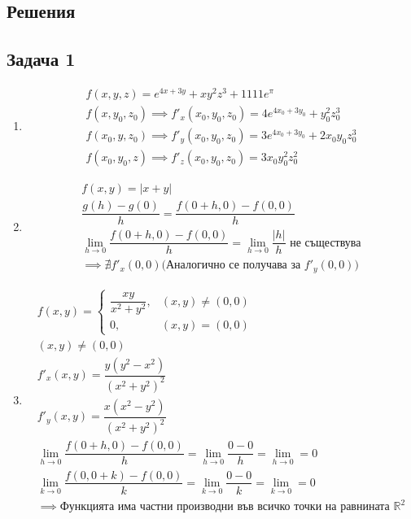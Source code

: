 \documentclass[a4paper,fleqn,12pt]{article}
\theoremstyle{definition}
\begin{document}
\newpage
\subsection{Решения}

\subsection*{Задача 1}

\begin{enumerate}
\item 
\begin{gather*}
f(x,y,z) = e^{4x+3y} + xy^2z^3 + 1111e^\pi \\
f(x,y_0,z_0) \implies f'_x (x_0,y_0,z_0) = 4e^{4x_0+3y_0} + y_0 ^2 z_0 ^3 \\
f(x_0,y,z_0) \implies f'_y (x_0,y_0,z_0) = 3e^{4x_0+3y_0} + 2x_0 y_0 z_0 ^3 \\
f(x_0,y_0,z) \implies f'_z (x_0,y_0,z_0) = 3x_0 y_0 ^2 z_0 ^2
\end{gather*}

\item 
\begin{gather*}
f(x,y) = \vert x + y \vert \\
\dfrac{g(h) - g(0)}{h} = \dfrac{f(0+h,0) - f(0,0)}{h} \\
\lim\limits_{h \to 0} \dfrac{f(0+h,0) - f(0,0)}{h} = \lim\limits_{h \to 0} \dfrac{\vert h \vert}{h} \text{ не съществува} \\
\implies \nexists f'_x (0,0) \text{(Аналогично се получава за $f'_y(0,0)$)} 
\end{gather*}

\item 
\begin{gather*}
f(x,y) = 
\begin{cases}
\dfrac{xy}{x^2 + y^2}, & (x,y) \neq (0,0)  \\
0, & (x,y) = (0,0) 
\end{cases}\\
(x,y) \neq (0,0)\\
f'_x (x,y) = \dfrac{y(y^2 - x^2)}{(x^2 + y^2)^2}\\
f'_y (x,y) = \dfrac{x(x^2 - y^2)}{(x^2 + y^2)^2}\\
\lim\limits_{h \to 0} \dfrac{f(0+h,0) - f(0,0)}{h} = \lim\limits_{h \to 0} \dfrac{0-0}{h} = \lim\limits_{h \to 0} = 0 \\
\lim\limits_{k \to 0} \dfrac{f(0,0+k) - f(0,0)}{k} =  \lim\limits_{k \to 0} \dfrac{0-0}{k} = \lim\limits_{k \to 0} = 0 \\
\implies  \text{Функцията има частни производни във всичко точки на равнината $\mathbb{R}^2$}
\end{gather*}
\end{enumerate}
\end{document}

